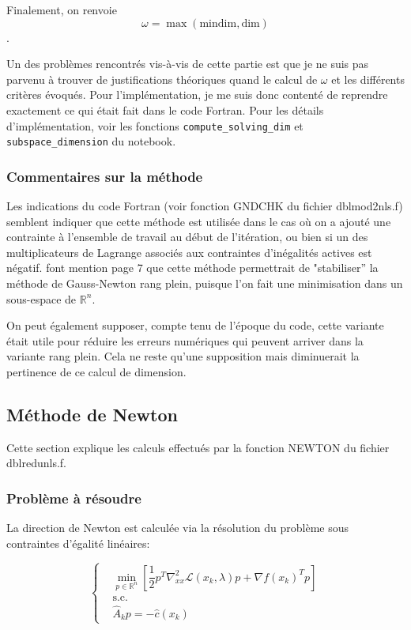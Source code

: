 \documentclass[a4paper,11pt]{article}
\newcommand{\real}{\mathbb{R}}
\newcommand{\ha}{\hat{A}}
\numberwithin{equation}{section}
\begin{document}
Finalement, on renvoie
$$\omega = \max(\text{mindim},\text{dim})$$.
 
 
Un des problèmes rencontrés vis-à-vis de cette partie est que je ne suis pas parvenu à trouver de justifications théoriques quand le calcul de $\omega$ et les différents critères évoqués. Pour l'implémentation, je me suis donc contenté de reprendre exactement ce qui était fait dans le code Fortran. Pour les détails d'implémentation, voir les fonctions \texttt{compute\_solving\_dim} et \texttt{subspace\_dimension} du notebook.


\subsubsection{Commentaires sur la méthode}

Les indications du code Fortran (voir fonction GNDCHK du fichier dblmod2nls.f) semblent indiquer que cette méthode est utilisée dans le cas où on a ajouté une contrainte à l'ensemble de travail au début de l'itération, ou bien si un des multiplicateurs de Lagrange associés aux contraintes d'inégalités actives est négatif.  \cite{lindstromwedin1988} font mention page 7 que cette méthode permettrait de "stabiliser'' la méthode de Gauss-Newton rang plein, puisque l'on fait une minimisation dans un sous-espace de $\real^{n}$. 

On peut également supposer, compte tenu de l'époque du code, cette variante était utile pour réduire les erreurs numériques qui peuvent arriver dans la variante rang plein. Cela ne reste qu'une supposition mais diminuerait la pertinence de ce calcul de dimension.


\subsection{Méthode de Newton} \label{newtonmethod}

Cette section explique les calculs effectués par la fonction NEWTON du fichier dblredunls.f.
\subsubsection{Problème à résoudre}

La direction de Newton est calculée via la résolution du problème sous contraintes d'égalité linéaires:

$$
\left\{ \begin{aligned}
&\underset{p \in \real^{n}}{\min}\left[ \dfrac{1}{2}p^{T}\nabla_{xx}^{2}\mathcal{L}(x_{k},\lambda)p + \nabla f(x_{k})^{T}p\right]\\
&\text{s.c.}\\
&\ha_{k} p = -\hat{c}(x_{k})
\end{aligned} \right.
$$
\end{document}
